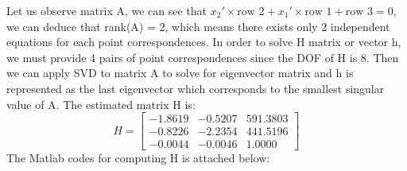\documentclass[letterpaper]{article}
\begin{document}
Let us observe matrix A, we can see that $x_2'\times \text{row 2} + x_1' \times \text{row 1} + \text{row 3} = 0$, we can deduce that rank(A) = 2, which means there exists only 2 independent  equations for each point correspondences. In order to solve H matrix or vector h, we must  provide 4 pairs of point correspondences since the DOF of H is 8. Then we can apply SVD to matrix A to solve for eigenvector matrix and h is represented as the last eigenvector which corresponds to the smallest singular value of A. The estimated matrix H is:
$$H = 
\begin{bmatrix}
-1.8619 & -0.5207 & 591.3803\\
-0.8226 & -2.2354 & 441.5196\\
-0.0044 & -0.0046 & 1.0000
\end{bmatrix}
$$
The Matlab codes for computing H is attached below:


\end{document}

